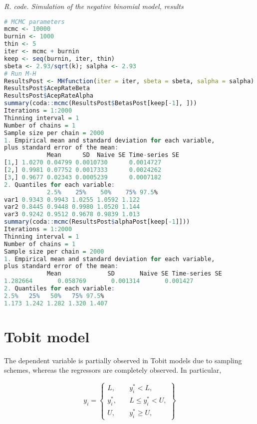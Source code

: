 \begin{tcolorbox}[enhanced,width=4.67in,center upper,
	fontupper=\large\bfseries,drop shadow southwest,sharp corners]
	\textit{R. code. Simulation of the negative binomial model, results}
	\begin{VF}
		\begin{lstlisting}[language=R]
# MCMC parameters
mcmc <- 10000
burnin <- 1000
thin <- 5
iter <- mcmc + burnin
keep <- seq(burnin, iter, thin)
sbeta <- 2.93/sqrt(k); salpha <- 2.93
# Run M-H
ResultsPost <- MHfunction(iter = iter, sbeta = sbeta, salpha = salpha)
ResultsPost$AcepRateBeta
ResultsPost$AcepRateAlpha
summary(coda::mcmc(ResultsPost$BetasPost[keep[-1], ]))
Iterations = 1:2000
Thinning interval = 1 
Number of chains = 1 
Sample size per chain = 2000 
1. Empirical mean and standard deviation for each variable,
plus standard error of the mean:
			Mean      SD  Naive SE Time-series SE
[1,] 1.0270 0.04799 0.0010730      0.0014727
[2,] 0.9981 0.07752 0.0017333      0.0024262
[3,] 0.9677 0.02343 0.0005239      0.0007182
2. Quantiles for each variable:
			2.5%    25%    50%    75% 97.5%
var1 0.9343 0.9943 1.0255 1.0592 1.122
var2 0.8445 0.9448 0.9980 1.0520 1.144
var3 0.9242 0.9512 0.9678 0.9839 1.013
summary(coda::mcmc(ResultsPost$alphaPost[keep[-1]]))
Iterations = 1:2000
Thinning interval = 1 
Number of chains = 1 
Sample size per chain = 2000 
1. Empirical mean and standard deviation for each variable,
plus standard error of the mean:
			Mean             SD       Naive SE Time-series SE 
1.282664       0.058769       0.001314       0.001427 
2. Quantiles for each variable:
2.5%   25%   50%   75% 97.5% 
1.173 1.242 1.282 1.320 1.407
\end{lstlisting}
	\end{VF}
\end{tcolorbox} 

\section{Tobit model}\label{sec68}
The dependent variable is partially observed in Tobit models due to sampling schemes, whereas the regressors are completely observed. In particular,

\begin{equation*}
	y_i = \begin{Bmatrix}
		L, & \quad y_i^* < L, \\
		y_i^*, & \quad L \leq y_i^* < U, \\
		U, & \quad y_i^* \geq U,
	\end{Bmatrix}
\end{equation*}

